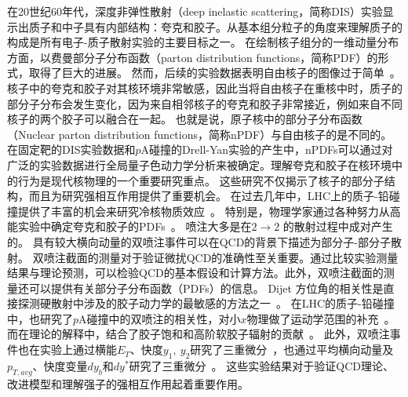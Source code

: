 	在20世纪60年代，深度非弹性散射（deep inelastic scattering，简称DIS）实验显示出质子和中子具有内部结构：夸克和胶子。从基本组分粒子的角度来理解质子的构成是所有电子-质子散射实验的主要目标之一。
	在绘制核子组分的一维动量分布方面，以费曼部分子分布函数（parton distribution functions，简称PDF）的形式，取得了巨大的进展。
	然而，后续的实验数据表明自由核子的图像过于简单~\parencite{EuropeanMuon:1981gyc,Bodek:1983qn}。核子中的夸克和胶子对其核环境非常敏感，因此当将自由核子在重核中时，质子的部分子分布会发生变化，因为来自相邻核子的夸克和胶子非常接近，例如来自不同核子的两个胶子可以融合在一起。
	也就是说，原子核中的部分子分布函数（Nuclear parton distribution functions，简称nPDF）与自由核子的是不同的。在固定靶的DIS实验数据和$p$A碰撞的Drell-Yan实验的产生中，nPDFs可以通过对广泛的实验数据进行全局量子色动力学分析来被确定。理解夸克和胶子在核环境中的行为是现代核物理的一个重要研究重点。	这些研究不仅揭示了核子的部分子结构，而且为研究强相互作用提供了重要机会。
	在过去几年中，LHC上的质子-铅碰撞提供了丰富的机会来研究冷核物质效应~\parencite{ATLAS:2015mwq,ALICE:2016rzo,ALICE:2020jff,CMS:2021ynu,LHCb:2022kph,CMS:2019leu,ALICE:2022cxs}。
	特别是，物理学家通过各种努力从高能实验中确定夸克和胶子的PDFs~\parencite{Hou:2019efy,Cocuzza:2021rfn,NNPDF:2017mvq,Alekhin:2017kpj}。
	喷注大多是在$2 \to 2$ 的散射过程中成对产生的。
	具有较大横向动量的双喷注事件可以在QCD的背景下描述为部分子-部分子散射。
	双喷注截面的测量对于验证微扰QCD的准确性至关重要。通过比较实验测量结果与理论预测，可以检验QCD的基本假设和计算方法。此外，双喷注截面的测量还可以提供有关部分子分布函数（PDFs）的信息。
	Dijet 方位角的相关性是直接探测硬散射中涉及的胶子动力学的最敏感的方法之一~\parencite{Marquet:2007vb,Dominguez:2011wm}。
	在LHC的质子-铅碰撞中，也研究了$p$A碰撞中的双喷注的相关性，对小$x$物理做了运动学范围的补充~\parencite{ATLAS:2019jgo}。而在理论的解释中，结合了胶子饱和和高阶软胶子辐射的贡献~\parencite{vanHameren:2019ysa}。
	此外，双喷注事件也在实验上通过横能$E_T$、快度$y_1, ~y_2$研究了三重微分~\parencite{CDF:1989car}，也通过平均横向动量及$p_{T,avg}$、快度变量$dy_b$和$dy^*$研究了三重微分~\parencite{CMS:2017jfq}。
	这些实验结果对于验证QCD理论、改进模型和理解强子的强相互作用起着重要作用。



